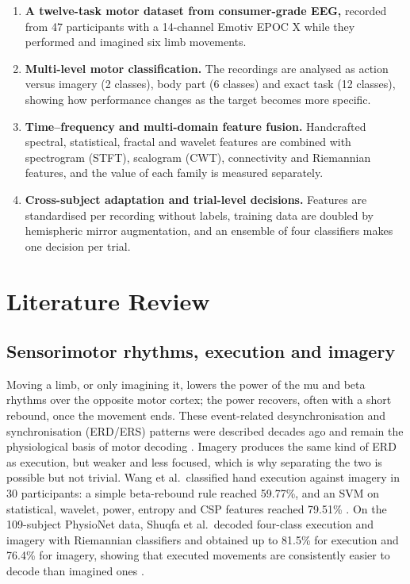 \documentclass[pdflatex,sn-mathphys-num]{sn-jnl}%
\theoremstyle{thmstyleone}%
\theoremstyle{thmstyletwo}%
\theoremstyle{thmstylethree}%
\begin{document}
\begin{enumerate}
\item \textbf{A twelve-task motor dataset from consumer-grade EEG,} recorded from 47 participants with a 14-channel Emotiv EPOC X while they performed and imagined six limb movements.
\item \textbf{Multi-level motor classification.} The recordings are analysed as action versus imagery (2 classes), body part (6 classes) and exact task (12 classes), showing how performance changes as the target becomes more specific.
\item \textbf{Time--frequency and multi-domain feature fusion.} Handcrafted spectral, statistical, fractal and wavelet features are combined with spectrogram (STFT), scalogram (CWT), connectivity and Riemannian features, and the value of each family is measured separately.
\item \textbf{Cross-subject adaptation and trial-level decisions.} Features are standardised per recording without labels, training data are doubled by hemispheric mirror augmentation, and an ensemble of four classifiers makes one decision per trial.
\end{enumerate}

\section{Literature Review}\label{sec:related}

\subsection{Sensorimotor rhythms, execution and imagery}
Moving a limb, or only imagining it, lowers the power of the mu and beta rhythms over the opposite motor cortex; the power recovers, often with a short rebound, once the movement ends. These event-related desynchronisation and synchronisation (ERD/ERS) patterns were described decades ago and remain the physiological basis of motor decoding \citep{PfurtschellerLopes1999,Pfurtscheller2001}. Imagery produces the same kind of ERD as execution, but weaker and less focused, which is why separating the two is possible but not trivial. Wang et al.\ classified hand execution against imagery in 30 participants: a simple beta-rebound rule reached 59.77\%, and an SVM on statistical, wavelet, power, entropy and CSP features reached 79.51\% \citep{Wang2022}. On the 109-subject PhysioNet data, Shuqfa et al.\ decoded four-class execution and imagery with Riemannian classifiers and obtained up to 81.5\% for execution and 76.4\% for imagery, showing that executed movements are consistently easier to decode than imagined ones \citep{Shuqfa2023}.
\end{document}
